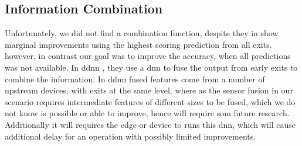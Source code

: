 \subsection*{Information Combination} 


Unfortunately, we did not find a combination function, despite they in \cite{kaya_shallow-deep_nodate} show marginal improvements using the highest scoring prediction from all exits. however, in contrast our goal was to improve the accuracy, when all predictions was not available. 
In \gls{ddnn} \cite{teerapittayanon_distributed_2017}, they use a \gls{dnn} to fuse the output from early exits to combine the information. In \gls{ddnn} fused features come from a number of upstream devices, with exits at the same level, where as the sensor fusion in our scenario requires intermediate features of different sizes to be fused, which we do not know is possible or able to improve, hence will require som future research. Additionally it will requires the edge or device to runs this \gls{dnn}, which will cause additional delay  for an operation with possibly limited improvements.